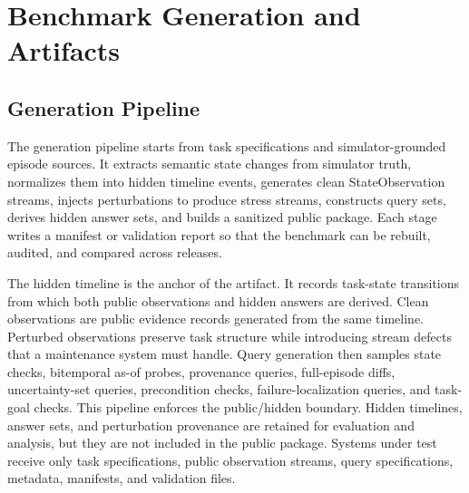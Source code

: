 
\section{Benchmark Generation and Artifacts}
\label{sec:generation}

\subsection{Generation Pipeline}

The generation pipeline starts from task specifications and simulator-grounded episode sources. It extracts semantic state changes from simulator truth, normalizes them into hidden timeline events, generates clean StateObservation streams, injects perturbations to produce stress streams, constructs query sets, derives hidden answer sets, and builds a sanitized public package. Each stage writes a manifest or validation report so that the benchmark can be rebuilt, audited, and compared across releases.

The hidden timeline is the anchor of the artifact. It records task-state transitions from which both public observations and hidden answers are derived. Clean observations are public evidence records generated from the same timeline. Perturbed observations preserve task structure while introducing stream defects that a maintenance system must handle. Query generation then samples state checks, bitemporal as-of probes, provenance queries, full-episode diffs, uncertainty-set queries, precondition checks, failure-localization queries, and task-goal checks.
This pipeline enforces the public/hidden boundary. Hidden timelines, answer sets, and perturbation provenance are retained for evaluation and analysis, but they are not included in the public package. Systems under test receive only task specifications, public observation streams, query specifications, metadata, manifests, and validation files.

